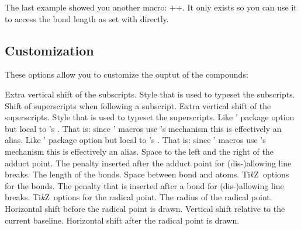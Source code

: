 \documentclass[load-preamble+]{cnltx-doc}
\newcommand*\TikZ{Ti\textit{k}Z}
\begin{document}
The last example showed you another macro: \verbcode+\chemformula@bondlength+.
It only exists so you can use it to access the bond length as set with
 directly.

\subsection{Customization}\label{ssec:compounds:customization}
These options allow you to customize the ouptut of the compounds:
\begin{options}
  \Default{0pt}
    Extra vertical shift of the subscripts.
    Style that is used to typeset the subscripts.
  \Default{.25em}
    Shift of superscripts when following a subscript.\label{desc:charge-hshift}
  \Default{0pt}
    Extra vertical shift of the superscripts.
    Style that is used to typeset the superscripts.
    Like \chemmacros' package option but local to
    \chemformula's .  That is: since \chemmacros' macros use
    \chemformula's mechanism this is effectively an alias.
    Like \chemmacros' package option but local to
    \chemformula's .  That is: since \chemmacros' macros use
    \chemformula's mechanism this is effectively an alias.
  \Default{.1333em}
    Space to the left and the right of the adduct point.
    The penalty inserted after the adduct point for
    (dis-)allowing line breaks.
  \Default{.5833em}
    The length of the bonds.
  \Default{.07em}
    Space between bond and atoms.
  \keyval{bond-style}{\TikZ}\Default
    \TikZ\ options for the bonds.
    The penalty that is inserted after a bond for
    (dis-)allowing line breaks.
  \keyval{radical-style}{\TikZ}\Default
    \TikZ\ options for the radical point.
  \Default{.2ex}
    The radius of the radical point.
  \Default{.15em}
    Horizontal shift before the radical point is drawn.
  \Default{.5ex}
    Vertical shift relative to the current baseline.
  \Default{.15em}
    Horizontal shift after the radical point is drawn.
\end{options}
\end{document}

